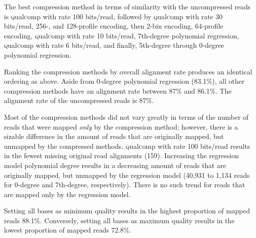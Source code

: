 The best compression method in terms of similarity with the
uncompressed reads is \textsc{q}ual\textsc{c}omp with rate 100 bits/read, followed by
\textsc{q}ual\textsc{c}omp with rate 30 bits/read, 256-, and 128-profile encoding, then
2-bin encoding, 64-profile encoding, \textsc{q}ual\textsc{c}omp with rate 10 bits/read,
7th-degree polynomial regression, \textsc{q}ual\textsc{c}omp with rate 6 bits/read, and
finally, 5th-degree through 0-degree polynomial regression.

Ranking the compression methods by overall alignment rate produces an
identical ordering as above. Aside from 0-degree polynomial
regression (83.1\%), all other compression methods have an alignment
rate between 87\% and 86.1\%. The alignment rate of the uncompressed
reads is 87\%.

Most of the compression methods did not vary greatly in terms of the
number of reads that were mapped \emph{only} by the compression
method; however, there is a sizable difference in the amount of reads
that are originally mapped, but unmapped by the compressed methods.
\textsc{q}ual\textsc{c}omp with rate 100 bits/read results in the fewest missing
original read alignments (159). Increasing the regression model
polynomial degree results in a decreasing amount of reads that are
originally mapped, but unmapped by the regression model (40,931 to
1,134 reads for 0-degree and 7th-degree, respectively). There is no
such trend for reads that are mapped only by the regression model.

Setting all bases as minimum quality results in the highest proportion
of mapped reads 88.1\%. Conversely, setting all bases as maximum
quality results in the lowest proportion of mapped reads 72.8\%.




